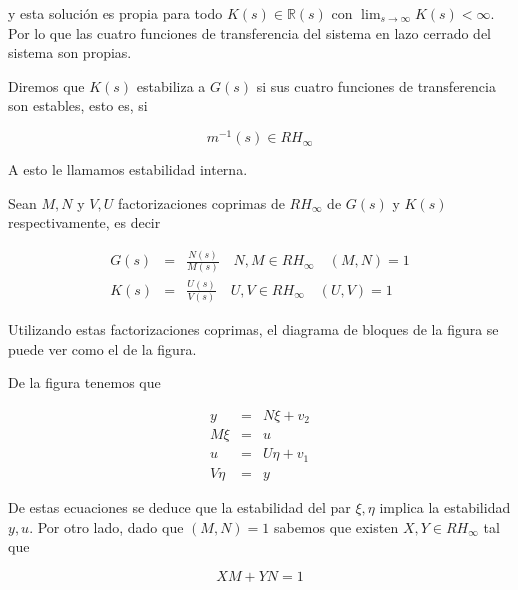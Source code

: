         y esta solución es propia para todo $K(s) \in \mathbb{R}(s)$ con $\lim_{s \to \infty} K(s) < \infty$.
        Por lo que las cuatro funciones de transferencia del sistema en lazo cerrado del sistema son propias.

        Diremos que $K(s)$ estabiliza a $G(s)$ si sus cuatro funciones de transferencia son estables, esto es, si

        \begin{equation*}
            m^{-1}(s) \in RH_{\infty}
        \end{equation*}

        A esto le llamamos estabilidad interna.

        Sean $M, N$ y $V, U$ factorizaciones coprimas de $RH_\infty$ de $G(s)$ y $K(s)$ respectivamente, es decir

        \begin{eqnarray} \label{eq:robus0}
            G(s) & = & \frac{N(s)}{M(s)} \quad N, M \in RH_{\infty} \quad (M, N) = 1 \\
            K(s) & = & \frac{U(s)}{V(s)} \quad U, V \in RH_{\infty} \quad (U, V) = 1
        \end{eqnarray}

        Utilizando estas factorizaciones coprimas, el diagrama de bloques de la figura se puede ver como el de la figura.


        De la figura tenemos que

        \begin{eqnarray} \label{eq:robus1}
            y & = & N \xi + v_2 \nonumber \\
            M \xi & = & u \nonumber \\
            u & = & U \eta + v_1 \nonumber \\
            V \eta & = & y
        \end{eqnarray}

        De estas ecuaciones se deduce que la estabilidad del par $\xi, \eta$ implica la estabilidad $y, u$.
        Por otro lado, dado que $(M, N) = 1$ sabemos que existen $X, Y \in RH_{\infty}$ tal que

        \begin{equation} \label{eq:robus2}
            X M + Y N = 1
        \end{equation}

